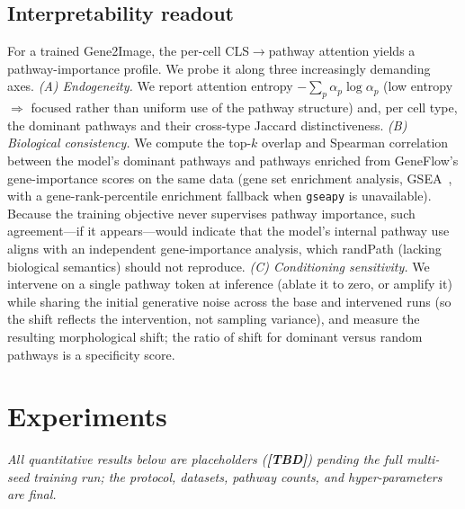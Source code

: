 \documentclass[journal]{IEEEtran}
\newcommand{\TBD}{{\color{red}\textbf{[TBD]}}}
\newcommand{\method}{Gene2Image}
\begin{document}
\subsection{Interpretability readout}
\label{sec:interp}
For a trained \method, the per-cell CLS$\rightarrow$pathway attention yields a
pathway-importance profile. We probe it along three increasingly demanding axes.
\emph{(A) Endogeneity.} We report attention entropy $-\sum_p \alpha_p\log\alpha_p$
(low entropy $\Rightarrow$ focused rather than uniform use of the pathway
structure) and, per cell type, the dominant pathways and their cross-type Jaccard
distinctiveness. \emph{(B) Biological consistency.} We compute the top-$k$ overlap
and Spearman correlation between the model's dominant pathways and pathways
enriched from GeneFlow's gene-importance scores on the same data (gene set
enrichment analysis, GSEA~\cite{gsea}, with a gene-rank-percentile enrichment
fallback when \texttt{gseapy} is unavailable). Because the training objective never supervises pathway
importance, such agreement---if it appears---would indicate that the model's
internal pathway use aligns with an independent gene-importance analysis, which
randPath (lacking biological semantics) should not reproduce. \emph{(C) Conditioning sensitivity.} We intervene on a
single pathway token at inference (ablate it to zero, or amplify it) while sharing
the initial generative noise across the base and intervened runs (so the shift
reflects the intervention, not sampling variance), and measure the resulting
morphological shift; the ratio of shift for dominant versus random pathways is a
specificity score.

\section{Experiments}
\label{sec:experiments}
\emph{All quantitative results below are placeholders (\TBD) pending the full
multi-seed training run; the protocol, datasets, pathway counts, and
hyper-parameters are final.}
\end{document}
